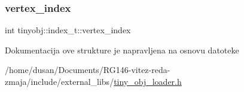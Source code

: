 \mbox{\label{structtinyobj_1_1index__t_a7eeb7de9f1fad091081b2b1d037c4beb}} 
\subsubsection{\texorpdfstring{vertex\+\_\+index}{vertex\_index}}
{\footnotesize\ttfamily int tinyobj\+::index\+\_\+t\+::vertex\+\_\+index}



Dokumentacija ove strukture je napravljena na osnovu datoteke \begin{DoxyCompactItemize}
\item 
/home/dusan/\+Documents/\+R\+G146-\/vitez-\/reda-\/zmaja/include/external\+\_\+libs/\hyperlink{tiny__obj__loader_8h}{tiny\+\_\+obj\+\_\+loader.\+h}\end{DoxyCompactItemize}
